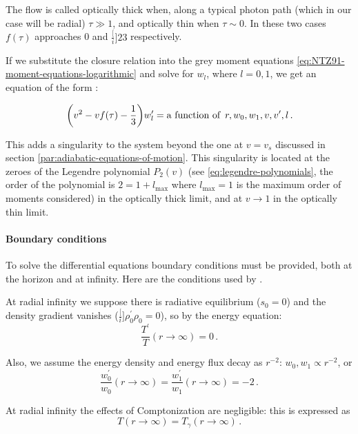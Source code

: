\documentclass[main.tex]{subfiles}
\begin{document}
The flow is called optically thick when, along a typical photon path (which in our case will be radial) \(\tau \gg 1\), and optically thin when \(\tau \sim 0\).
In these two cases \(f(\tau)\) approaches 0 and \(\frac[i]{2}{3}\) respectively.

If we substitute the closure relation into the grey moment equations \eqref{eq:NTZ91-moment-equations-logarithmic} and solve for \(w_l\), where \(l=0,1\), we get an equation of the form \cite[eq. 18]{NobiliTurollaZampieri:1991dec}:

\begin{equation}
  \qty(v^2 - v f(\tau) - \frac{1}{3}) w_l^{\prime} = \text{a function of }\, r, w_0, w_1, v, v', l \,.
\end{equation}

This adds a singularity to the system beyond the one at \(v=v_s\) discussed in section \ref{par:adiabatic-equations-of-motion}. This singularity is located at the zeroes of the Legendre polynomial \(P_2 (v)\) (see \eqref{eq:legendre-polynomials}, the order of the polynomial is \(2 = 1+ l_{\text{max}}\) where \(l_{\text{max}}=1\) is the maximum order of moments considered) in the optically thick limit, and at \(v \rightarrow 1\) in the optically thin limit.

\paragraph{Boundary conditions}

To solve the differential equations boundary conditions must be provided, both at the horizon and at infinity. Here are the conditions used by \textcite[]{NobiliTurollaZampieri:1991dec}.

At radial infinity we suppose there is radiative equilibrium (\(s_0 = 0\)) and the density gradient vanishes (\(\frac[i]{\rho_0 ^{\prime}}{\rho_0} = 0 \)), so by the energy equation:
%
\begin{equation}
  \frac{T ^{\prime}}{T} (r \rightarrow \infty) = 0\,.
\end{equation}

Also, we assume the energy density and energy flux decay as \(r^{-2}\): \(w_0,w_1 \propto r^{-2}\), or
%
\begin{equation}
  \frac{w_0 ^{\prime}}{w_0} (r \rightarrow \infty) = \frac{w_1 ^{\prime}}{w_1} (r \rightarrow \infty) = -2\,.
\end{equation}

At radial infinity the effects of Comptonization are negligible: this is expressed as
%
\begin{equation}
  T(r \rightarrow \infty) = T_\gamma (r \rightarrow \infty)\,.
\end{equation}
\end{document}
